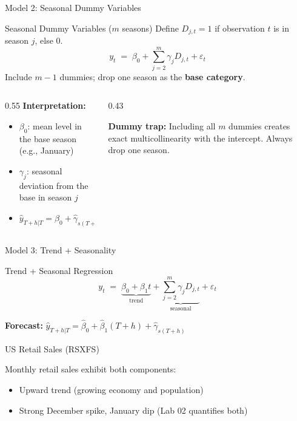 \documentclass[aspectratio=169, 11pt]{beamer}
\begin{document}
\begin{frame}{Model 2: Seasonal Dummy Variables}
  \begin{definitionbox}{Seasonal Dummy Variables ($m$ seasons)}
    {\small Define $D_{j,t} = 1$ if observation $t$ is in season $j$, else $0$.
    \[
      y_t \;=\; \beta_0 + \sum_{j=2}^{m} \gamma_j D_{j,t} + \varepsilon_t
    \]
    Include $m-1$ dummies; drop one season as the \textbf{base category}.}
  \end{definitionbox}
  \begin{columns}[T]
    \begin{column}{0.55\textwidth}
      \textbf{Interpretation:}
      {\small\begin{itemize}
        \item $\beta_0$: mean level in the base season (e.g., January)
        \item $\gamma_j$: seasonal deviation from the base in season $j$
        \item $\hat{y}_{T+h|T} = \hat{\beta}_0 + \hat{\gamma}_{s(T+h)}$
      \end{itemize}}
    \end{column}
    \begin{column}{0.43\textwidth}
      \begin{warningbox}
        \small
        \textbf{Dummy trap:} Including all $m$ dummies creates
        exact multicollinearity with the intercept.
        Always drop one season.
      \end{warningbox}
    \end{column}
  \end{columns}
\end{frame}

\begin{frame}{Model 3: Trend + Seasonality}
  \begin{definitionbox}{Trend + Seasonal Regression}
    \[
      y_t \;=\; \underbrace{\beta_0 + \beta_1 t}_{\text{trend}}
             + \underbrace{\sum_{j=2}^{m} \gamma_j D_{j,t}}_{\text{seasonal}}
             + \varepsilon_t
    \]
  \end{definitionbox}
  \textbf{Forecast:}
  $\hat{y}_{T+h|T} = \hat{\beta}_0 + \hat{\beta}_1(T+h) + \hat{\gamma}_{s(T+h)}$ \hfill{}

  \begin{examplebox}{US Retail Sales (RSXFS)}
    {\small Monthly retail sales exhibit both components:
    \begin{itemize}
      \item Upward trend (growing economy and population)
      \item Strong December spike, January dip (Lab 02 quantifies both)
    \end{itemize}}
  \end{examplebox}
\end{frame}
\end{document}
